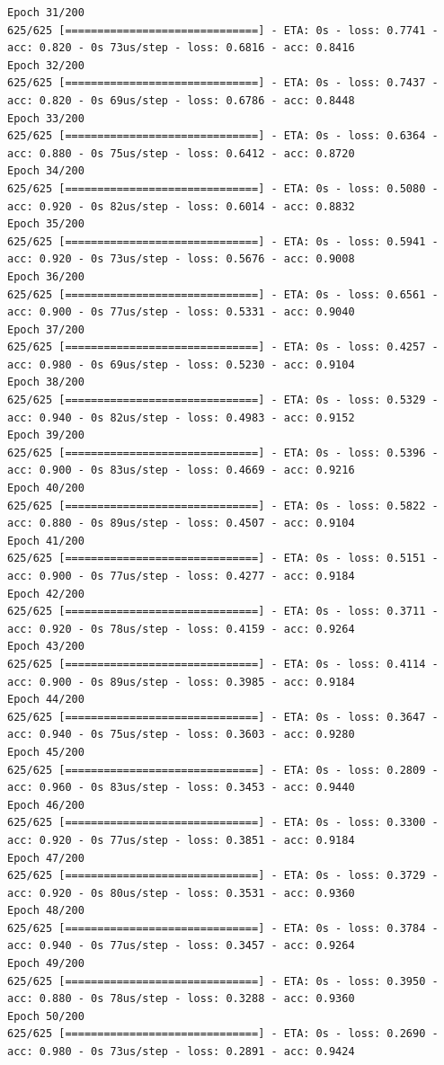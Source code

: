 \documentclass[11pt]{article}
\begin{document}
\begin{Verbatim}[commandchars=\\\{\}]
Epoch 31/200
625/625 [==============================] - ETA: 0s - loss: 0.7741 - acc: 0.820 - 0s 73us/step - loss: 0.6816 - acc: 0.8416
Epoch 32/200
625/625 [==============================] - ETA: 0s - loss: 0.7437 - acc: 0.820 - 0s 69us/step - loss: 0.6786 - acc: 0.8448
Epoch 33/200
625/625 [==============================] - ETA: 0s - loss: 0.6364 - acc: 0.880 - 0s 75us/step - loss: 0.6412 - acc: 0.8720
Epoch 34/200
625/625 [==============================] - ETA: 0s - loss: 0.5080 - acc: 0.920 - 0s 82us/step - loss: 0.6014 - acc: 0.8832
Epoch 35/200
625/625 [==============================] - ETA: 0s - loss: 0.5941 - acc: 0.920 - 0s 73us/step - loss: 0.5676 - acc: 0.9008
Epoch 36/200
625/625 [==============================] - ETA: 0s - loss: 0.6561 - acc: 0.900 - 0s 77us/step - loss: 0.5331 - acc: 0.9040
Epoch 37/200
625/625 [==============================] - ETA: 0s - loss: 0.4257 - acc: 0.980 - 0s 69us/step - loss: 0.5230 - acc: 0.9104
Epoch 38/200
625/625 [==============================] - ETA: 0s - loss: 0.5329 - acc: 0.940 - 0s 82us/step - loss: 0.4983 - acc: 0.9152
Epoch 39/200
625/625 [==============================] - ETA: 0s - loss: 0.5396 - acc: 0.900 - 0s 83us/step - loss: 0.4669 - acc: 0.9216
Epoch 40/200
625/625 [==============================] - ETA: 0s - loss: 0.5822 - acc: 0.880 - 0s 89us/step - loss: 0.4507 - acc: 0.9104
Epoch 41/200
625/625 [==============================] - ETA: 0s - loss: 0.5151 - acc: 0.900 - 0s 77us/step - loss: 0.4277 - acc: 0.9184
Epoch 42/200
625/625 [==============================] - ETA: 0s - loss: 0.3711 - acc: 0.920 - 0s 78us/step - loss: 0.4159 - acc: 0.9264
Epoch 43/200
625/625 [==============================] - ETA: 0s - loss: 0.4114 - acc: 0.900 - 0s 89us/step - loss: 0.3985 - acc: 0.9184
Epoch 44/200
625/625 [==============================] - ETA: 0s - loss: 0.3647 - acc: 0.940 - 0s 75us/step - loss: 0.3603 - acc: 0.9280
Epoch 45/200
625/625 [==============================] - ETA: 0s - loss: 0.2809 - acc: 0.960 - 0s 83us/step - loss: 0.3453 - acc: 0.9440
Epoch 46/200
625/625 [==============================] - ETA: 0s - loss: 0.3300 - acc: 0.920 - 0s 77us/step - loss: 0.3851 - acc: 0.9184
Epoch 47/200
625/625 [==============================] - ETA: 0s - loss: 0.3729 - acc: 0.920 - 0s 80us/step - loss: 0.3531 - acc: 0.9360
Epoch 48/200
625/625 [==============================] - ETA: 0s - loss: 0.3784 - acc: 0.940 - 0s 77us/step - loss: 0.3457 - acc: 0.9264
Epoch 49/200
625/625 [==============================] - ETA: 0s - loss: 0.3950 - acc: 0.880 - 0s 78us/step - loss: 0.3288 - acc: 0.9360
Epoch 50/200
625/625 [==============================] - ETA: 0s - loss: 0.2690 - acc: 0.980 - 0s 73us/step - loss: 0.2891 - acc: 0.9424

\end{Verbatim}
\end{document}
